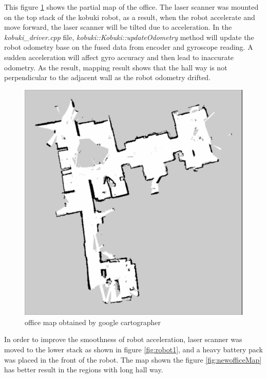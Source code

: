 \documentclass[letterpaper, 10 pt, conference]{ieeeconf}  %
\begin{document}
This figure \ref{fig:officeMap} shows the partial map of the office. The laser scanner was mounted on the top stack of the kobuki robot, as a result, when the robot accelerate and move forward, the laser scanner will be tilted due to acceleration. In the \textit{kobuki\_driver.cpp} file, \textit{kobuki::Kobuki::updateOdometry} method will update the robot odometry base on the fused data from encoder and gyroscope reading. A sudden acceleration will affect gyro accuracy and then lead to inaccurate odometry. As the result, mapping result shows that the hall way is not perpendicular to the adjacent wall as the robot odometry drifted.  

\begin{figure}[!pht]
  \centerline{\includegraphics[width=0.8\linewidth]{officeMap.png}}
  \caption{office map obtained by google cartographer} 
  \label{fig:officeMap}
\end{figure}

\vspace{5pt}
In order to improve the smoothness of robot acceleration, laser scanner was moved to the lower stack as shown in figure \ref{fig:robot1}, and a heavy battery pack was placed in the front of the robot. The map shown the figure \ref{fig:newofficeMap} has better result in the regions with long hall way.  
\end{document}
